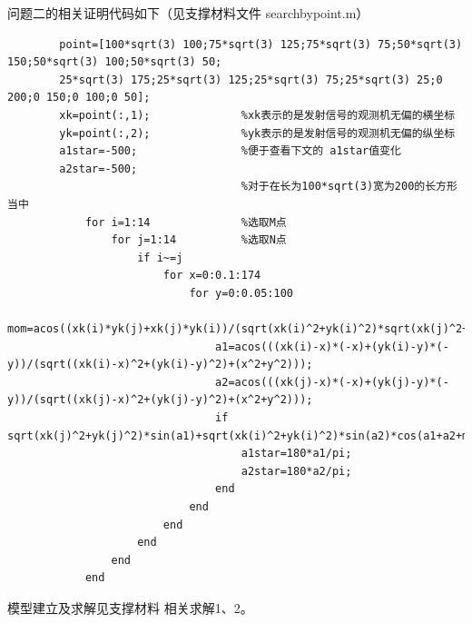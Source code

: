 \documentclass{ctexart}
\begin{document}
	\newpage
	问题二的相关证明代码如下（见支撑材料文件 searchbypoint.m）
	\begin{lstlisting}
		point=[100*sqrt(3) 100;75*sqrt(3) 125;75*sqrt(3) 75;50*sqrt(3) 150;50*sqrt(3) 100;50*sqrt(3) 50;
		25*sqrt(3) 175;25*sqrt(3) 125;25*sqrt(3) 75;25*sqrt(3) 25;0 200;0 150;0 100;0 50];
		xk=point(:,1);				%xk表示的是发射信号的观测机无偏的横坐标
		yk=point(:,2);				%yk表示的是发射信号的观测机无偏的纵坐标
		a1star=-500;				%便于查看下文的 a1star值变化
		a2star=-500;
									%对于在长为100*sqrt(3)宽为200的长方形当中
			for i=1:14 				%选取M点
				for j=1:14			%选取N点
					if i~=j
						for x=0:0.1:174
							for y=0:0.05:100
								mom=acos((xk(i)*yk(j)+xk(j)*yk(i))/(sqrt(xk(i)^2+yk(i)^2)*sqrt(xk(j)^2+yk(j)^2)));
								a1=acos(((xk(i)-x)*(-x)+(yk(i)-y)*(-y))/(sqrt((xk(i)-x)^2+(yk(i)-y)^2)+(x^2+y^2)));
								a2=acos(((xk(j)-x)*(-x)+(yk(j)-y)*(-y))/(sqrt((xk(j)-x)^2+(yk(j)-y)^2)+(x^2+y^2)));
								if sqrt(xk(j)^2+yk(j)^2)*sin(a1)+sqrt(xk(i)^2+yk(i)^2)*sin(a2)*cos(a1+a2+mom)==0
									a1star=180*a1/pi;
									a2star=180*a2/pi;
								end
							end
						end    
					end
				end
			end
		\end{lstlisting}

	模型建立及求解见支撑材料 相关求解1、2。
\end{document}
